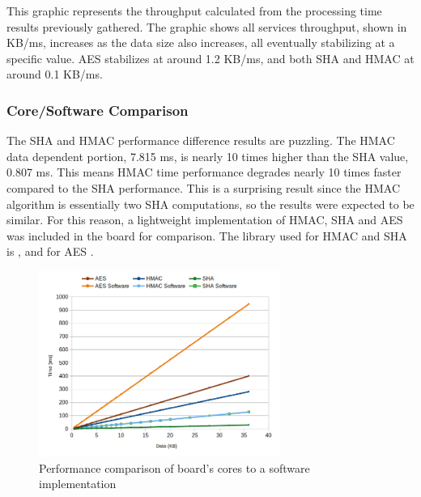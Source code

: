 This graphic represents the throughput calculated from the processing time results previously gathered. The graphic shows all services throughput, shown in KB/ms, increases as the data size also increases, all eventually stabilizing at a specific value. \ac{AES} stabilizes at around 1.2 KB/ms, and both \ac{SHA} and \ac{HMAC} at around 0.1 KB/ms.

\subsubsection{Core/Software Comparison}\label{chap:evaluation:services:software}

The SHA and HMAC performance difference results are puzzling. The HMAC data dependent portion, 7.815 ms, is nearly 10 times higher than the SHA value, 0.807 ms. This means HMAC time performance degrades nearly 10 times faster compared to the SHA performance. This is a surprising result since the HMAC algorithm is essentially two SHA computations, so the results were expected to be similar.
For this reason, a lightweight implementation of HMAC, SHA and AES was included in the board for comparison. The library used for HMAC and SHA is \cite{ogayHMAC}, and for AES \cite{tinycrypt}. 

\begin{figure}[h!]
	\centering
	\includegraphics[width=0.7\textwidth]{./Images/software-core-time.png}
	\caption{Performance comparison of board's cores to a software implementation}
	\label{fig:performance:software-core-time}
\end{figure}

